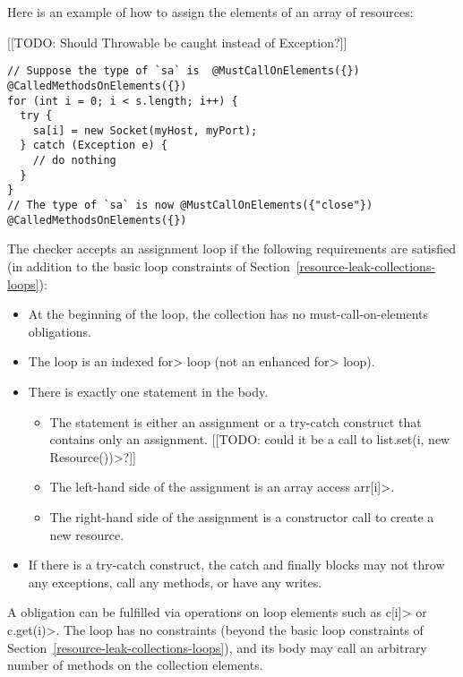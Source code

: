 Here is an example of how to assign the elements of an array of resources:

[[TODO: Should Throwable be caught instead of Exception?]]

\begin{Verbatim}
// Suppose the type of `sa` is  @MustCallOnElements({}) @CalledMethodsOnElements({})
for (int i = 0; i < s.length; i++) {
  try {
    sa[i] = new Socket(myHost, myPort);
  } catch (Exception e) {
    // do nothing
  }
}
// The type of `sa` is now @MustCallOnElements({"close"}) @CalledMethodsOnElements({})
\end{Verbatim}

The checker accepts an assignment loop if the following requirements are
satisfied (in addition to the basic loop constraints of Section~\ref{resource-leak-collections-loops}):

\begin{itemize}
  \item At the beginning of the loop, the collection has no must-call-on-elements obligations.
  \item The loop is an indexed \<for> loop (not an enhanced \<for> loop).
  \item There is exactly one statement in the body.
    \begin{itemize}
      \item The statement is either an
        assignment or a try-catch construct that contains only an assignment.
        [[TODO: could it be a call to \<list.set(i, new Resource())>?]]
      \item The left-hand side of the assignment is an array access \<arr[i]>.
      \item The right-hand side of the assignment is a constructor call to
        create a new resource.
    \end{itemize}
  \item If there is a try-catch construct, the catch and finally blocks may
    not throw any exceptions, call any methods, or have any writes.
\end{itemize}



A \MustCallOnElements obligation can be fulfilled via operations on loop
elements such as \<c[i]> or \<c.get(i)>.
The loop has no constraints (beyond the basic loop constraints of
Section~\ref{resource-leak-collections-loops}), and its body may call an
arbitrary number of methods on the collection elements.

